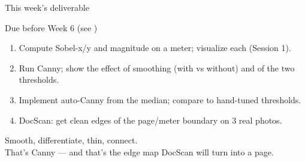 \documentclass[10pt,aspectratio=169]{beamer}
\begin{document}
\begin{frame}{This week's deliverable}
  \begin{alertblock}{Due before Week 6 (see )}
    \begin{enumerate}
      \item Compute Sobel-x/y and magnitude on a meter; visualize each (Session 1).
      \item Run Canny; show the effect of smoothing (with vs without) and of the two thresholds.
      \item Implement auto-Canny from the median; compare to hand-tuned thresholds.
      \item DocScan: get clean edges of the page/meter boundary on 3 real photos.
    \end{enumerate}
  \end{alertblock}
\end{frame}

\begin{frame}[standout]
  Smooth, differentiate, thin, connect.\\[4pt]
  \normalsize That's Canny — and that's the edge map DocScan will turn into a page.
\end{frame}
\end{document}
